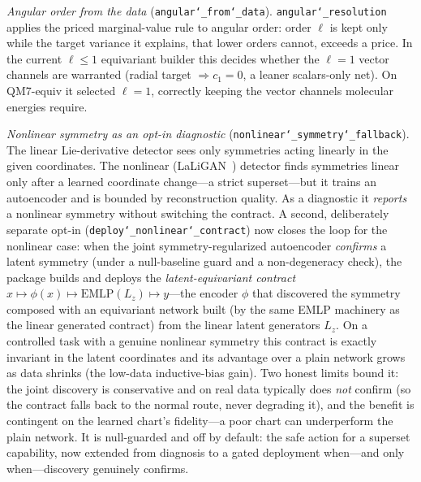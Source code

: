 \documentclass[11pt]{article}
\newcommand{\allowbreakhere}{\discretionary{}{}{}}
\newcommand{\code}[1]{\texttt{\def\_{\char`_\allowbreakhere}#1}}
\begin{document}
\emph{Angular order from the data} (\code{angular\_from\_data}). \code{angular\_resolution} applies the priced
marginal-value rule to angular order: order $\ell$ is kept only while the target variance it explains, that
lower orders cannot, exceeds a price. In the current $\ell\le1$ equivariant builder this decides whether the
$\ell=1$ vector channels are warranted (radial target $\Rightarrow c_1=0$, a leaner scalars-only net). On
QM7-equiv it selected $\ell=1$, correctly keeping the vector channels molecular energies require.

\emph{Nonlinear symmetry as an opt-in diagnostic} (\code{nonlinear\_symmetry\_fallback}). The linear
Lie-derivative detector sees only symmetries acting linearly in the given coordinates. The nonlinear
(LaLiGAN~\cite{yang2023laligan}) detector finds symmetries linear only after a learned coordinate change---a strict superset---but it
trains an autoencoder and is bounded by reconstruction quality. As a diagnostic it \emph{reports} a nonlinear
symmetry without switching the contract. A second, deliberately separate opt-in
(\code{deploy\_nonlinear\_contract}) now closes the loop for the nonlinear case: when the joint
symmetry-regularized autoencoder \emph{confirms} a latent symmetry (under a null-baseline guard and a
non-degeneracy check), the package builds and deploys the \emph{latent-equivariant contract}
$x\mapsto\phi(x)\mapsto\mathrm{EMLP}(L_z)\mapsto y$---the encoder $\phi$ that discovered the symmetry composed
with an equivariant network built (by the same EMLP machinery as the linear generated contract) from the
linear latent generators $L_z$. On a controlled task with a genuine nonlinear symmetry this contract is
exactly invariant in the latent coordinates and its advantage over a plain network grows as data shrinks
(the low-data inductive-bias gain). Two honest limits bound it: the joint discovery is conservative and on
real data typically does \emph{not} confirm (so the contract falls back to the normal route, never degrading
it), and the benefit is contingent on the learned chart's fidelity---a poor chart can underperform the plain
network. It is null-guarded and off by default: the safe action for a superset capability, now extended from
diagnosis to a gated deployment when---and only when---discovery genuinely confirms.
\end{document}
